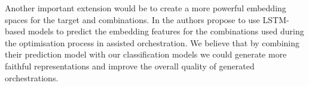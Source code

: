 \documentclass[runningheads,a4paper]{llncs}
\begin{document}
Another important extension would be to create a more powerful embedding spaces for the target and combinations. In \cite{Gillick19} the authors propose to use LSTM-based models to predict the embedding features for the combinations used during the optimisation process in assisted orchestration. We believe that by combining their prediction model with our classification models we could generate more faithful representations and improve the overall quality of generated orchestrations.



\end{document}
